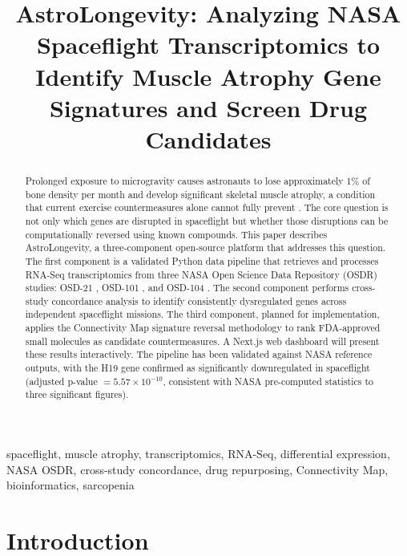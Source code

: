 \documentclass[conference]{IEEEtran}
\begin{document}
\title{AstroLongevity: Analyzing NASA Spaceflight Transcriptomics to Identify Muscle Atrophy Gene Signatures and Screen Drug Candidates}

\author{
}

\maketitle

\begin{abstract}
Prolonged exposure to microgravity causes astronauts to lose approximately 1\% of bone density per month and develop significant skeletal muscle atrophy, a condition that current exercise countermeasures alone cannot fully prevent \cite{lloyd2023}. The core question is not only which genes are disrupted in spaceflight but whether those disruptions can be computationally reversed using known compounds. This paper describes AstroLongevity, a three-component open-source platform that addresses this question. The first component is a validated Python data pipeline that retrieves and processes RNA-Seq transcriptomics from three NASA Open Science Data Repository (OSDR) studies: OSD-21 \cite{osd21}, OSD-101 \cite{osd101}, and OSD-104 \cite{osd104}. The second component performs cross-study concordance analysis to identify consistently dysregulated genes across independent spaceflight missions. The third component, planned for implementation, applies the Connectivity Map signature reversal methodology to rank FDA-approved small molecules as candidate countermeasures. A Next.js web dashboard will present these results interactively. The pipeline has been validated against NASA reference outputs, with the H19 gene confirmed as significantly downregulated in spaceflight (adjusted p-value $= 5.57 \times 10^{-10}$, consistent with NASA pre-computed statistics to three significant figures).
\end{abstract}

\begin{IEEEkeywords}
spaceflight, muscle atrophy, transcriptomics, RNA-Seq, differential expression, NASA OSDR, cross-study concordance, drug repurposing, Connectivity Map, bioinformatics, sarcopenia
\end{IEEEkeywords}

\section{Introduction}
\end{document}
